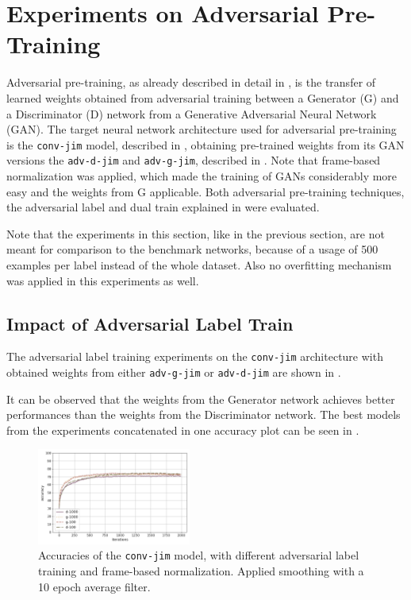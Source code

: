 
\section{Experiments on Adversarial Pre-Training}\label{sec:exp_adv}
\thesisStateReady
Adversarial pre-training, as already described in detail in , is the transfer of learned weights obtained from adversarial training between a Generator (G) and a Discriminator (D) network from a Generative Adversarial Neural Network (GAN).
The target neural network architecture used for adversarial pre-training is the \texttt{conv-jim} model, described in , obtaining pre-trained weights from its GAN versions the \texttt{adv-d-jim} and \texttt{adv-g-jim}, described in .
Note that frame-based normalization was applied, which made the training of GANs considerably more easy and the weights from G applicable.
Both adversarial pre-training techniques, the adversarial label and dual train explained in  were evaluated.

Note that the experiments in this section, like in the previous section, are not meant for comparison to the benchmark networks, because of a usage of 500 examples per label instead of the whole dataset.
Also no overfitting mechanism was applied in this experiments as well.



\subsection{Impact of Adversarial Label Train}\label{sec:exp_adv_label}
The adversarial label training experiments on the \texttt{conv-jim} architecture with obtained weights from either \texttt{adv-g-jim} or \texttt{adv-d-jim} are shown in .

It can be observed that the weights from the Generator network achieves better performances than the weights from the Discriminator network.
The best models from the experiments concatenated in one accuracy plot can be seen in .
\begin{figure}[!ht]
  \centering
  \includegraphics[width=0.45\textwidth]{./5_exp/figs/exp_adv_label_acc_conv-jim}
  \caption{Accuracies of the \texttt{conv-jim} model, with different adversarial label training and frame-based normalization. Applied smoothing with a 10 epoch average filter.}
  \label{fig:exp_adv_label_acc_conv-jim}
\end{figure}
\FloatBarrier
\noindent

